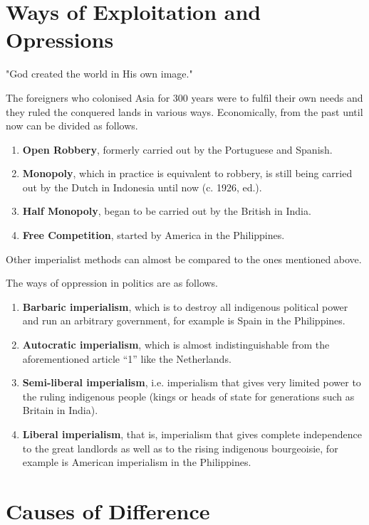 \section{Ways of Exploitation and Opressions}

"God created the world in His own image."\nline

The foreigners who colonised Asia for 300 years were to fulfil 
their own needs and they ruled the conquered lands in various ways. 
Economically, from the past until now can be divided as follows.\nline

\begin{enumerate}
    \item \textbf{Open Robbery}, formerly carried out by the Portuguese and Spanish.
    \item \textbf{Monopoly}, which in practice is equivalent to robbery, is still being carried out by the Dutch in Indonesia until now (c. 1926, ed.).
    \item \textbf{Half Monopoly}, began to be carried out by the British in India.
    \item \textbf{Free Competition}, started by America in the Philippines.
\end{enumerate}

Other imperialist methods can almost be compared to the ones mentioned above.\nline

The ways of oppression in politics are as follows.

\begin{enumerate}
    \item \textbf{Barbaric imperialism}, which is to destroy all indigenous political power and run an arbitrary government, for example is Spain in the Philippines.
    \item \textbf{Autocratic imperialism}, which is almost indistinguishable from the aforementioned article “1” like the Netherlands.
    \item \textbf{Semi-liberal imperialism}, i.e. imperialism that gives very limited power to the ruling indigenous people (kings or heads of state for generations such as Britain in India).
    \item \textbf{Liberal imperialism}, that is, imperialism that gives complete independence to the great landlords as well as to the rising indigenous bourgeoisie, for example is American imperialism in the Philippines.
\end{enumerate}

\section{Causes of Difference}

